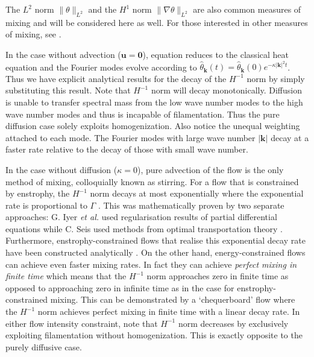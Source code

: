 \documentclass[12pt]{iopart}
\newcommand{\ltwo}[1]{\|#1\|_{L^{2}}}
\newcommand{\hone}[1]{\| \nabla #1\|_{L^{2}}}
\renewcommand{\vec}[1]{\mathbf{#1}}
\begin{document}
The $L^{2}$ norm $\ltwo{\theta}$ and the $H^{1}$ norm $\hone{\theta}$ are also common measures of mixing and will be considered here as well.  For those interested in other measures of mixing, see \cite{JLT2012}. 

In the case without advection ($\vec{u}=\vec{0}$), equation  reduces to the classical heat equation \cite{Evans2010} and the Fourier modes evolve according to $\hat{\theta}_{\vec{k}}(t)=\hat{\theta}_{\vec{k}}(0)e^{-\kappa|\vec{k}|^2t}$. Thus we have explicit analytical results for the decay of the $H^{-1}$ norm by simply substituting this result. Note that $H^{-1}$ norm will decay monotonically. Diffusion is unable to transfer spectral mass from the low wave number modes to the high wave number modes and thus is incapable of filamentation. Thus the pure diffusion case solely exploits homogenization. Also notice the unequal weighting attached to each mode. The Fourier modes with large wave number $|\vec{k}|$ decay at a faster rate relative to the decay of those with small wave number.




In the case without diffusion ($\kappa = 0$), pure advection of the flow is the only method of mixing, colloquially known as stirring. For a flow that is constrained by enstrophy, the $H^{-1}$ norm decays at most exponentially where the exponential rate is proportional to $\Gamma$ \cite{GI2014,CS2013}. This was mathematically proven by two separate approaches: G. Iyer {\it et al.} \cite{GI2014} used regularisation results \cite{Crippa} of partial differential equations  while C. Seis \cite{CS2013} used methods from optimal transportation theory \cite{villani2003topics}. Furthermore, enstrophy-constrained flows that realise this exponential decay rate have been constructed analytically \cite{Alberti2014a}. On the other hand, energy-constrained flows can achieve even faster mixing rates. In fact they can achieve {\it perfect mixing in finite time} which means that the $H^{-1}$ norm approaches zero in finite time as opposed to approaching zero in infinite time as in the case for enstrophy-constrained mixing. This can be demonstrated by a `chequerboard' flow \cite{JMP2012} where the  $H^{-1}$ norm achieves perfect mixing in finite time with a linear decay rate.  In either flow intensity constraint, note that $H^{-1}$ norm decreases by exclusively exploiting filamentation without homogenization. This is  exactly opposite to the purely diffusive case.
\end{document}
